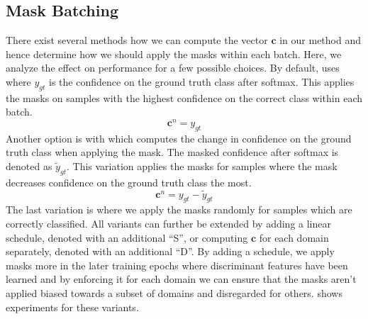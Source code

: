 \subsection{Mask Batching}
\label{sec:ablation_study_batching}

There exist several methods how we can compute the vector $\mathbf{c}$ in our method and hence determine how we should apply the masks within each batch. Here, we analyze the effect on performance for a few possible choices. By default, \divcam uses  where $y_{gt}$ is the confidence on the ground truth class after softmax. This applies the masks on samples with the highest confidence on the correct class within each batch.   
\begin{equation}
\label{eq:conf_scamb}
	\mathbf{c}^n = y_{gt}
\end{equation}
Another option is \divcamc with  which computes the change in confidence on the ground truth class when applying the mask. The masked confidence after softmax is denoted as $\tilde{y}_{gt}$. This variation applies the masks for samples where the mask decreases confidence on the ground truth class the most.
\begin{equation}
\label{eq:conf_scamc}
   \mathbf{c}^n = y_{gt} - \tilde{y}_{gt}
\end{equation}
The last variation is \divcamt where we apply the masks randomly for samples which are correctly classified. All variants can further be extended by adding a linear schedule, denoted with an additional ``S'', or computing $\mathbf{c}$ for each domain separately, denoted with an additional ``D''. By adding a schedule, we apply masks more in the later training epochs where discriminant features have been learned and by enforcing it for each domain we can ensure that the masks aren't applied biased towards a subset of domains and disregarded for others.  shows experiments for these variants.


